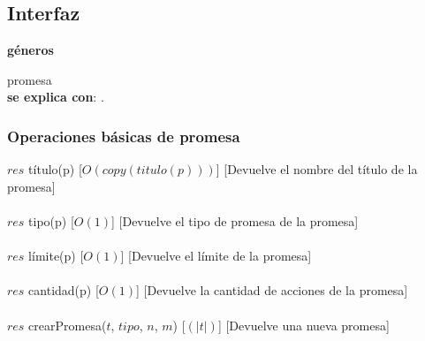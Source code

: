 \subsection{Interfaz}


   \parbox{1.7cm}{\textbf{g\'eneros}} promesa\\

  \textbf{se explica con}: .


  \subsubsection{Operaciones b\'asicas de promesa}
  {$res$ \igobs t\'itulo(p)}
  [$O(copy(titulo(p)))$]
  [Devuelve el nombre del t\'itulo de la promesa]\\\\
  {$res$ \igobs tipo(p)}
  [$O(1)$]
  [Devuelve el tipo de promesa de la promesa]\\\\
  {$res$ \igobs l\'imite(p)}
  [$O(1)$]
  [Devuelve el l\'imite de la promesa]\\\\
  {$res$ \igobs cantidad(p)}
  [$O(1)$]
  [Devuelve la cantidad de acciones de la promesa]\\\\
  {$res$ \igobs crearPromesa($t$, $tipo$, $n$, $m$)}
  [$(|t|)$]
  [Devuelve una nueva promesa]\\\\



